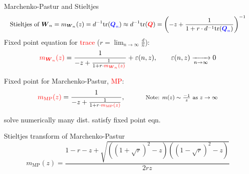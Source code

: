 \documentclass[10pt]{beamer}
\begin{document}

\begin{frame}{Marchenko-Pastur and Stieltjes}
 \[{\small \text{Stieltjes of ${\boldsymbol W}_n$} = m_{{\boldsymbol W}_n}(z) = d^{-1} \text{tr}({\textcolor{blue}{\boldsymbol Q_n}}) \approx d^{-1}\text{tr}({\textcolor{red}{\boldsymbol Q}}) = \left (-z + \frac{1}{1 + r \cdot d^{-1} \text{tr}({\textcolor{blue}{\boldsymbol Q_n}})} \right )^{-1} }\]
 \pause
Fixed point equation for \textcolor{red}{trace} {\footnotesize ($\displaystyle r = \lim_{n \to \infty} \tfrac{d}{n}$)}:
\begin{equation*} 
\begin{gathered} 
\textcolor{red}{m_{{\boldsymbol W}_n}(z)} = \frac{1}{-z + \frac{1}{1 + r \cdot \textcolor{red}{m_{{\boldsymbol W}_n}(z)}}} + \varepsilon(n, z), \qquad \varepsilon(n,z) \xrightarrow[n \to \infty]{} 0 \\
\end{gathered}
\end{equation*}

Fixed point for Marchenko-Pastur, \textcolor{red}{MP}:
\begin{equation*}\begin{gathered}
 \textcolor{red}{m_{\text{MP}}(z)} = \frac{1}{-z + \frac{1}{1 + r \cdot \textcolor{red}{m_{\text{MP}}(z)}}}, \qquad \quad \text{\footnotesize Note: $m(z) \sim \tfrac{-1}{z}$ as $z \to \infty$}
\end{gathered}
\end{equation*}
\begin{center}
 { \checkmark} solve numerically \qquad { \checkmark} many dist. satisfy fixed point eqn.\\
\end{center}
\pause
{}
\begin{exampleblock}{Stieltjes transform of Marchenko-Pastur} 
\[m_{\text{MP}}(z) = \frac{1-r-z + \sqrt{((1+\sqrt{r})^2-z)((1-\sqrt{r})^2-z)}}{2rz}\]
\end{exampleblock}
\end{frame}
\end{document}
